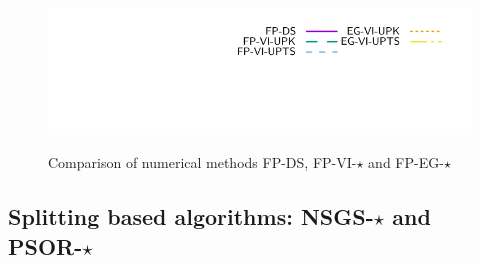\begin{figure}[htbp]
 \\
   {\includegraphics[height=\legendheight]{figure/VI/UpdateRule/1.0e-08/50/time/profile-Chain_legend.pdf}}
   \setlength{\abovecaptionskip}{-40pt}
   \caption{Comparison of numerical methods {\sf FP-DS, FP-VI-$\star$} and {\sf FP-EG-$\star$}}
\label{fig:VI/UpdateRule}
\end{figure}



\subsection{Splitting based algorithms: {\sf NSGS-$\star$} and {\sf PSOR-$\star$}}

